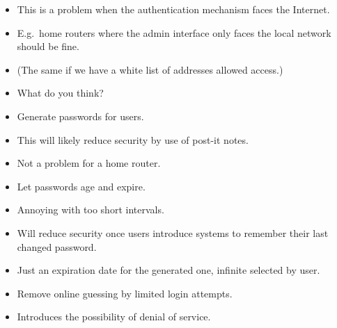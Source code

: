 \begin{frame}
  \begin{exercise}
    \begin{itemize}
      \item This is a problem when the authentication mechanism faces the 
        Internet.

      \item E.g.\ home routers where the admin interface only faces the local 
        network should be fine.

      \item (The same if we have a white list of addresses allowed access.)

      \item What do you think?
    \end{itemize}
  \end{exercise}
\end{frame}

\begin{frame}
  \begin{example}
    \begin{itemize}
      \item Generate passwords for users.
      \item This will likely reduce security by use of post-it notes.
      \item Not a problem for a home router.
    \end{itemize}
  \end{example}
\end{frame}

\begin{frame}
  \begin{example}
    \begin{itemize}
      \item Let passwords age and expire.
      \item Annoying with too short intervals.
      \item Will reduce security once users introduce systems to remember their 
        last changed password.
      \item Just an expiration date for the generated one, infinite selected by
        user.
    \end{itemize}
  \end{example}
\end{frame}

\begin{frame}
  \begin{example}
    \begin{itemize}
      \item Remove online guessing by limited login attempts.
      \item Introduces the possibility of denial of service.
    \end{itemize}
  \end{example}
\end{frame}

